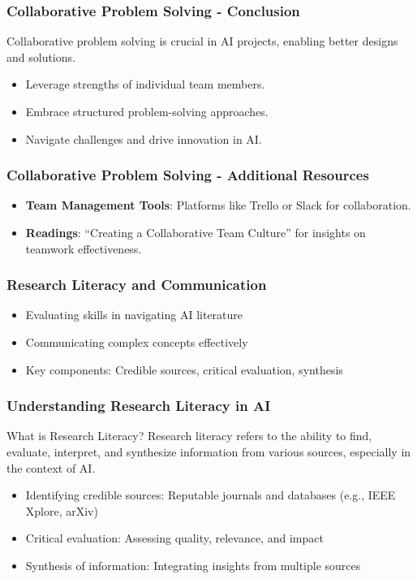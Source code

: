 \documentclass{beamer}
\begin{document}
\begin{frame}[fragile]
    \frametitle{Collaborative Problem Solving - Conclusion}
    Collaborative problem solving is crucial in AI projects, enabling better designs and solutions. 
    \begin{itemize}
        \item Leverage strengths of individual team members.
        \item Embrace structured problem-solving approaches.
        \item Navigate challenges and drive innovation in AI.
    \end{itemize}
\end{frame}

\begin{frame}[fragile]
    \frametitle{Collaborative Problem Solving - Additional Resources}
    \begin{itemize}
        \item \textbf{Team Management Tools}: Platforms like Trello or Slack for collaboration.
        \item \textbf{Readings}: “Creating a Collaborative Team Culture” for insights on teamwork effectiveness.
    \end{itemize}
\end{frame}

\begin{frame}[fragile]
    \frametitle{Research Literacy and Communication}
    \begin{itemize}
        \item Evaluating skills in navigating AI literature
        \item Communicating complex concepts effectively
        \item Key components: Credible sources, critical evaluation, synthesis
    \end{itemize}
\end{frame}

\begin{frame}[fragile]
    \frametitle{Understanding Research Literacy in AI}
    \begin{block}{What is Research Literacy?}
        Research literacy refers to the ability to find, evaluate, interpret, and synthesize information from various sources, especially in the context of AI.
    \end{block}
    
    \begin{itemize}
        \item Identifying credible sources: Reputable journals and databases (e.g., IEEE Xplore, arXiv)
        \item Critical evaluation: Assessing quality, relevance, and impact
        \item Synthesis of information: Integrating insights from multiple sources
    \end{itemize}
\end{frame}
\end{document}
